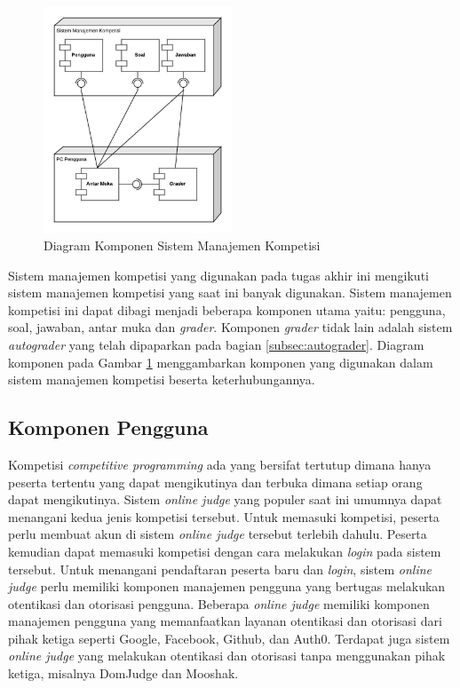 \begin{figure}[ht!]
    \centering
    \includegraphics[width=0.5\textwidth]{images/oj-components}
    \caption{Diagram Komponen Sistem Manajemen Kompetisi}
    \label{fig:oj-components}
\end{figure}

\par Sistem manajemen kompetisi yang digunakan pada tugas akhir ini mengikuti sistem manajemen kompetisi yang saat ini banyak digunakan. Sistem manajemen kompetisi ini dapat dibagi menjadi beberapa komponen utama yaitu: pengguna, soal, jawaban, antar muka dan \textit{grader}. Komponen \textit{grader} tidak lain adalah sistem \textit{autograder} yang telah dipaparkan pada bagian \ref{subsec:autograder}. Diagram komponen pada Gambar \ref{fig:oj-components} menggambarkan komponen yang digunakan dalam sistem manajemen kompetisi beserta keterhubungannya.

\subsection{Komponen Pengguna}

\par Kompetisi \textit{competitive programming} ada yang bersifat tertutup dimana hanya peserta tertentu yang dapat mengikutinya dan terbuka dimana setiap orang dapat mengikutinya. Sistem \textit{online judge} yang populer saat ini umumnya dapat menangani kedua jenis kompetisi tersebut. Untuk memasuki kompetisi, peserta perlu membuat akun di sistem \textit{online judge} tersebut terlebih dahulu. Peserta kemudian dapat memasuki kompetisi dengan cara melakukan \textit{login} pada sistem tersebut. Untuk menangani pendaftaran peserta baru dan \textit{login}, sistem \textit{online judge} perlu memiliki komponen manajemen pengguna yang bertugas melakukan otentikasi dan otorisasi pengguna. Beberapa \textit{online judge} memiliki komponen manajemen pengguna yang memanfaatkan layanan otentikasi dan otorisasi dari pihak ketiga seperti Google, Facebook, Github, dan Auth0. Terdapat juga sistem \textit{online judge} yang melakukan otentikasi dan otorisasi tanpa menggunakan pihak ketiga, misalnya DomJudge dan Mooshak.

